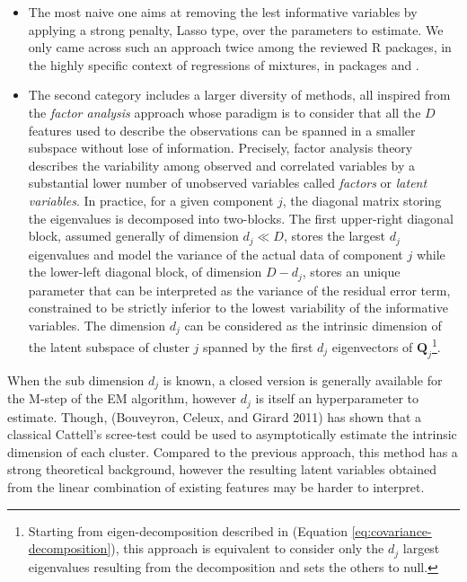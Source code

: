 \begin{itemize}
\item
  The most naive one aims at removing the lest informative variables by applying a strong penalty, Lasso type, over the parameters to estimate. We only came across such an approach twice among the reviewed R packages, in the highly specific context of regressions of mixtures, in packages  and .
\item
  The second category includes a larger diversity of methods, all inspired from the \emph{factor analysis} approach whose paradigm is to consider that all the \(D\) features used to describe the observations can be spanned in a smaller subspace without lose of information. Precisely, factor analysis theory describes the variability among observed and correlated variables by a substantial lower number of unobserved variables called \emph{factors} or \emph{latent variables}. In practice, for a given component \(j\), the diagonal matrix storing the eigenvalues is decomposed into two-blocks. The first upper-right diagonal block, assumed generally of dimension \(d_j \ll D\), stores the largest \(d_j\) eigenvalues and model the variance of the actual data of component \(j\) while the lower-left diagonal block, of dimension \(D-d_j\), stores an unique parameter that can be interpreted as the variance of the residual error term, constrained to be strictly inferior to the lowest variability of the informative variables. The dimension \(d_j\) can be considered as the intrinsic dimension of the latent subspace of cluster \(j\) spanned by the first \(d_j\) eigenvectors of \(\boldsymbol{Q}_j\)\footnote{Starting from eigen-decomposition described in (Equation \eqref{eq:covariance-decomposition}), this approach is equivalent to consider only the \(d_j\) largest eigenvalues resulting from the decomposition and sets the others to null.}.
\end{itemize}

When the sub dimension \(d_j\) is known, a closed version is generally available for the M-step of the EM algorithm, however \(d_j\) is itself an hyperparameter to estimate. Though, (Bouveyron, Celeux, and Girard 2011) has shown that a classical Cattell's scree-test could be used to asymptotically estimate the intrinsic dimension of each cluster. Compared to the previous approach, this method has a strong theoretical background, however the resulting latent variables obtained from the linear combination of existing features may be harder to interpret.

